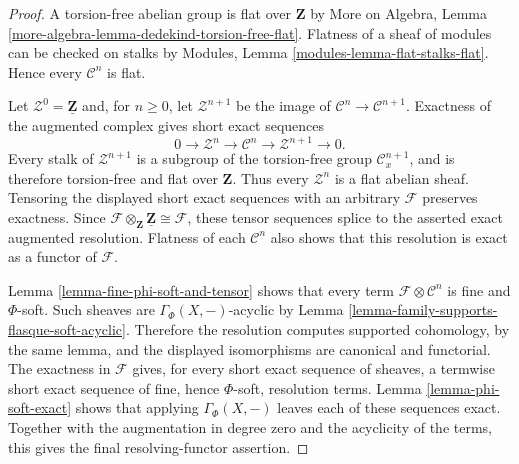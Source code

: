 \begin{proof}
A torsion-free abelian group is flat over $\mathbf Z$ by More on Algebra,
Lemma \ref{more-algebra-lemma-dedekind-torsion-free-flat}. Flatness of a
sheaf of modules can be checked on stalks by Modules, Lemma
\ref{modules-lemma-flat-stalks-flat}. Hence every $\mathcal C^n$ is flat.

Let $\mathcal Z^0=\underline{\mathbf Z}$ and, for $n\geq0$, let
$\mathcal Z^{n+1}$ be the image of
$\mathcal C^n\to\mathcal C^{n+1}$. Exactness of the augmented complex
gives short exact sequences
$$
0\longrightarrow\mathcal Z^n\longrightarrow\mathcal C^n
\longrightarrow\mathcal Z^{n+1}\longrightarrow0.
$$
Every stalk of $\mathcal Z^{n+1}$ is a subgroup of the torsion-free group
$\mathcal C^{n+1}_x$, and is therefore torsion-free and flat over
$\mathbf Z$. Thus every $\mathcal Z^n$ is a flat abelian sheaf. Tensoring
the displayed short exact sequences with an arbitrary $\mathcal F$
preserves exactness. Since
$\mathcal F\otimes_{\mathbf Z}\underline{\mathbf Z}\cong\mathcal F$,
these tensor sequences splice to the asserted exact augmented resolution.
Flatness of each $\mathcal C^n$ also shows that this resolution is exact
as a functor of $\mathcal F$.

Lemma \ref{lemma-fine-phi-soft-and-tensor} shows that every term
$\mathcal F\otimes\mathcal C^n$ is fine and $\Phi$-soft. Such sheaves are
$\Gamma_\Phi(X,-)$-acyclic by
Lemma \ref{lemma-family-supports-flasque-soft-acyclic}. Therefore the
resolution computes supported cohomology, by the same lemma, and the
displayed isomorphisms are canonical and functorial. The exactness in
$\mathcal F$ gives, for every short exact sequence of sheaves, a termwise
short exact sequence of fine, hence $\Phi$-soft, resolution terms. Lemma
\ref{lemma-phi-soft-exact} shows that applying $\Gamma_\Phi(X,-)$ leaves
each of these sequences exact. Together with the augmentation in degree
zero and the acyclicity of the terms, this gives the final
resolving-functor assertion.
\end{proof}



